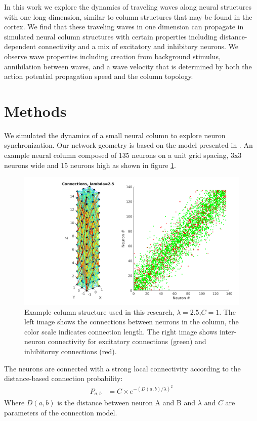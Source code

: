 \documentclass[a4paper,11pt]{article}
\begin{document}
In this work we explore the dynamics of traveling waves along neural structures with one long dimension, similar to column structures that may be found in the cortex.
We find that these traveling waves in one dimension can propagate in simulated neural column structures with certain properties including distance-dependent connectivity and a mix of excitatory and inhibitory neurons. 
We observe wave properties including creation from background stimulus, annihilation between waves, and a wave velocity that is determined by both the action potential propagation speed and the column topology. 

\section{Methods}
We simulated the dynamics of a small neural column to explore neuron synchronization.
Our network geometry is based on the model presented in \cite{markram1998}.
An example neural column composed of 135 neurons on a unit grid spacing, 3x3 neurons wide and 15 neurons high as shown in figure \ref{fig:column_structure}.
\begin{figure}[!htb]
 \caption{Example column structure used in this research, $\lambda=2.5$,$C=1$. The left image shows the connections between neurons in the column, the color scale indicates connection length. The right image shows inter-neuron connectivity for excitatory connections (green) and inhibitoruy connections (red).}
 \label{fig:column_structure}
 \centering
   \includegraphics[width=\textwidth]{fig/lambda2}
\end{figure}
The neurons are connected with a strong local connectivity according to the distance-based connection probability:
\begin{align}\label{eq:connectivity}
 P_{a,b} &= C \times e^{-(D(a,b)/\lambda)^2}
\end{align}
Where $D(a,b)$ is the distance between neuron A and B and $\lambda$ and $C$ are parameters of the connection model.
\end{document}

